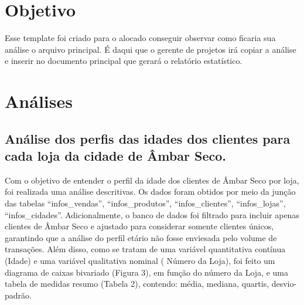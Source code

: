 \documentclass[
]{estat/estat}
\author{}
\date{}
\let\oldsection\section
\renewcommand\section{\clearpage\oldsection}
\renewcommand*\contentsname{Índice}
\newcommand\contentsname{Índice}
\begin{document}
\fancyhf{} 

\fancyhead[L]{} %
\renewcommand{\headrulewidth}{0pt}   %

\fancyfoot[R]{\textcolor{white}{\thepage}} %

\pagestyle{fancy} 



\renewcommand*\contentsname{Sumário}
{
\hypersetup{linkcolor=}
\setcounter{tocdepth}{3}
\tableofcontents
}

\section{Objetivo}\label{objetivo}

Esse template foi criado para o alocado conseguir observar como ficaria
sua análise o arquivo principal. É daqui que o gerente de projetos irá
copiar a análise e inserir no documento principal que gerará o relatório
estatístico.

\section{Análises}\label{anuxe1lises}

\subsection{Análise dos perfis das idades dos clientes para cada loja da
cidade de Âmbar
Seco.}\label{anuxe1lise-dos-perfis-das-idades-dos-clientes-para-cada-loja-da-cidade-de-uxe2mbar-seco.}

Com o objetivo de entender o perfil da idade dos clientes de Âmbar Seco
por loja, foi realizada uma análise descritivas. Os dados foram obtidos
por meio da junção das tabelas ``infos\_vendas'', ``infos\_produtos'',
``infos\_clientes'', ``infos\_lojas'', ``infos\_cidades''.
Adicionalmente, o banco de dados foi filtrado para incluir apenas
clientes de Âmbar Seco e ajustado para considerar somente clientes
únicos, garantindo que a análise do perfil etário não fosse enviesada
pelo volume de transações. Além disso, como se tratam de uma variável
quantitativa contínua (Idade) e uma variável qualitativa nominal (
Número da Loja), foi feito um diagrama de caixas bivariado (Figura 3),
em função do número da Loja, e uma tabela de medidas resumo (Tabela 2),
contendo: média, mediana, quartis, desvio-padrão.
\end{document}
